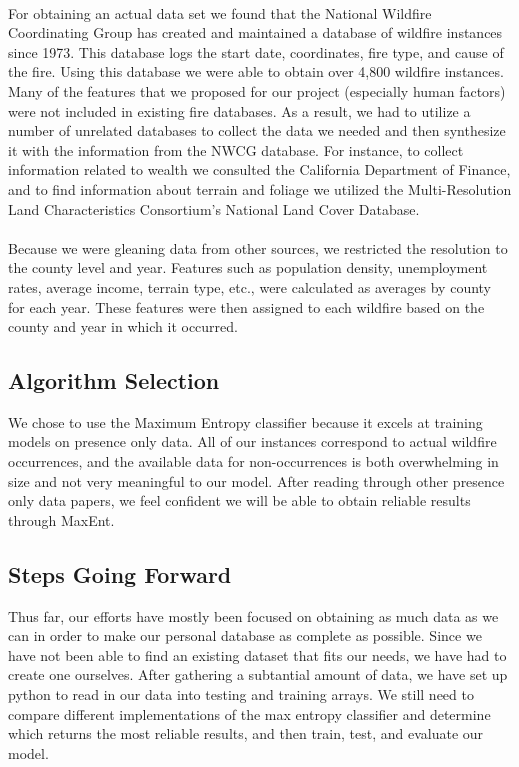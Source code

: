 \documentclass{article}
\begin{document}
\paragraph{}
For obtaining an actual data set we found that the National Wildfire Coordinating Group has created and maintained a database of wildfire instances since 1973. This database logs the start date, coordinates, fire type, and cause of the fire. Using this database we were able to obtain over 4,800 wildfire instances. 
Many of the features that we proposed for our project (especially human factors) were not included in existing fire databases.  As a result, we had to utilize a number of unrelated databases to collect the data we needed and then synthesize it with the information from the NWCG database.  For instance, to collect information related to wealth we consulted the California Department of Finance, and to find information about terrain and foliage we utilized the Multi-Resolution Land Characteristics Consortium’s National Land Cover Database. 
\paragraph{}
Because we were gleaning data from other sources, we restricted the resolution to the county level and year.  Features such as population density, unemployment rates, average income, terrain type, etc., were calculated as averages by county for each year.  These features were then assigned to each wildfire based on the county and year in which it occurred.
\subsection{Algorithm Selection}
We chose to use the Maximum Entropy classifier because it  excels at training models on presence only data.  All of our instances correspond to actual wildfire occurrences, and the available data for non-occurrences is both overwhelming in size and not very meaningful to our model. After reading through other presence only data papers, we feel confident we will be able to obtain reliable results through MaxEnt. 
\subsection{Steps Going Forward}
Thus far, our efforts have mostly been focused on obtaining as much data as we can in order to make our personal database as complete as possible.  Since we have not been able to find an existing dataset that fits our needs, we have had to create one ourselves. After gathering a subtantial amount of data, we have  set up python to read in our data into testing and training arrays. We still need to compare different implementations of the max entropy classifier and determine which returns the most reliable results, and then train, test, and evaluate our model. 
\end{document}
